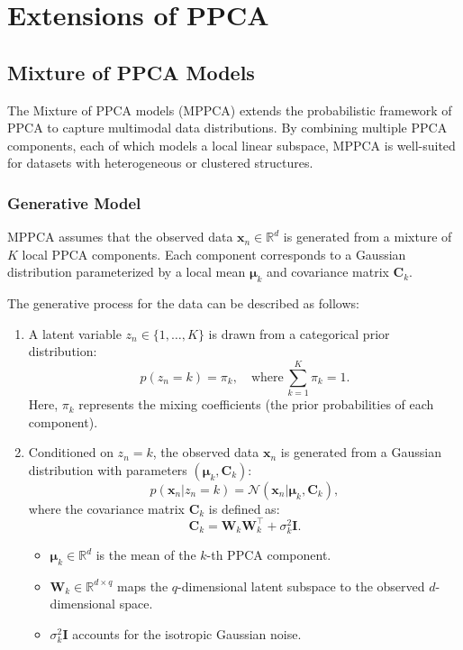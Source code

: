 \documentclass{article}
\begin{document}
\section{Extensions of PPCA}

\subsection{Mixture of PPCA Models}


The Mixture of PPCA models (MPPCA) extends the probabilistic framework of PPCA to capture multimodal data distributions. By combining multiple PPCA components, each of which models a local linear subspace, MPPCA is well-suited for datasets with heterogeneous or clustered structures.

\subsubsection{Generative Model}

MPPCA assumes that the observed data \(\mathbf{x}_n \in \mathbb{R}^d\) is generated from a mixture of \(K\) local PPCA components. Each component corresponds to a Gaussian distribution parameterized by a local mean \(\boldsymbol{\mu}_k\) and covariance matrix \(\mathbf{C}_k\).

The generative process for the data can be described as follows:
\begin{enumerate}
    \item A latent variable \(z_n \in \{1, \dots, K\}\) is drawn from a categorical prior distribution:
    \[
    p(z_n = k) = \pi_k, \quad \text{where} \, \sum_{k=1}^K \pi_k = 1.
    \]
    Here, \(\pi_k\) represents the mixing coefficients (the prior probabilities of each component).

    \item Conditioned on \(z_n = k\), the observed data \(\mathbf{x}_n\) is generated from a Gaussian distribution with parameters \((\boldsymbol{\mu}_k, \mathbf{C}_k)\):
    \[
    p(\mathbf{x}_n | z_n = k) = \mathcal{N}(\mathbf{x}_n | \boldsymbol{\mu}_k, \mathbf{C}_k),
    \]
    where the covariance matrix \(\mathbf{C}_k\) is defined as:
    \[
    \mathbf{C}_k = \mathbf{W}_k \mathbf{W}_k^\top + \sigma_k^2 \mathbf{I}.
    \]
    \begin{itemize}
        \item \(\boldsymbol{\mu}_k \in \mathbb{R}^d\) is the mean of the \(k\)-th PPCA component.
        \item \(\mathbf{W}_k \in \mathbb{R}^{d \times q}\) maps the \(q\)-dimensional latent subspace to the observed \(d\)-dimensional space.
        \item \(\sigma_k^2 \mathbf{I}\) accounts for the isotropic Gaussian noise.
    \end{itemize}
\end{enumerate}
\end{document}
